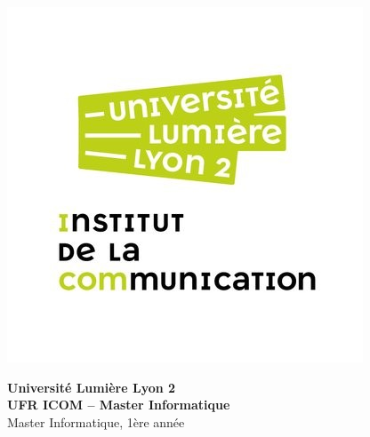 \documentclass[12pt]{extarticle}
\begin{document}
\vspace*{-1.5cm}
\begin{tcolorbox}[colframe=myblue, colback=white, boxrule=1pt, arc=4pt, width=\textwidth, left=0pt, right=0pt, top=2pt, bottom=2pt]
    \begin{minipage}{0.20\textwidth}
        \includegraphics[width=\textwidth]{image/icom.jpg}
    \end{minipage}
    \hfill
    \begin{minipage}{0.6\textwidth}
        \centering
        {\large\bfseries Université Lumière Lyon 2}\\[0.3em]
        {\normalsize\bfseries UFR ICOM – Master Informatique}\\[0.3em]
        {\small Master Informatique, 1ère année}
    \end{minipage}
    \hfill
    \begin{minipage}{0.18\textwidth}

\end{minipage}
\end{tcolorbox}
\end{document}
